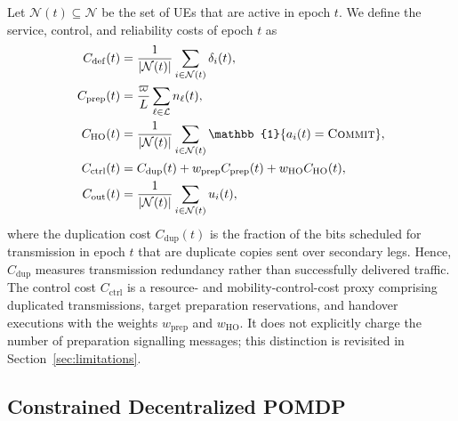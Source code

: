 \documentclass[journal]{IEEEtran}
\newcommand{\Lset}{\mathcal{L}}
\newcommand{\Nset}{\mathcal{N}}
\newcommand{\ind}{\mathbb{1}}
\begin{document}
Let $\Nset(t)\subseteq\Nset$ be the set of UEs that are active in epoch $t$.
We define the service, control, and reliability costs of epoch $t$ as
\begin{align}
C_{\mathrm{def}}(t) &= \frac{1}{|\Nset(t)|}\sum_{i\in\Nset(t)}\delta_i(t),\\
C_{\mathrm{prep}}(t) &= \frac{\varpi}{L}\sum_{\ell\in\Lset}n_\ell(t),\\
C_{\mathrm{HO}}(t) &= \frac{1}{|\Nset(t)|}\sum_{i\in\Nset(t)}\ind\{a_i(t)=\textsc{Commit}\},\\
C_{\mathrm{ctrl}}(t) &= C_{\mathrm{dup}}(t)+w_{\mathrm{prep}}C_{\mathrm{prep}}(t)+w_{\mathrm{HO}}C_{\mathrm{HO}}(t),\\
C_{\mathrm{out}}(t) &= \frac{1}{|\Nset(t)|}\sum_{i\in\Nset(t)}u_i(t),
\end{align}
where the duplication cost $C_{\mathrm{dup}}(t)$ is the fraction of the bits
scheduled for transmission in epoch $t$ that are duplicate copies sent over
secondary legs. Hence, $C_{\mathrm{dup}}$ measures transmission redundancy
rather than successfully delivered traffic. The control cost
$C_{\mathrm{ctrl}}$ is a resource- and mobility-control-cost proxy comprising
duplicated transmissions, target preparation reservations, and handover
executions with the weights $w_{\mathrm{prep}}$ and $w_{\mathrm{HO}}$. It does
not explicitly charge the number of preparation signalling messages; this
distinction is revisited in Section~\ref{sec:limitations}.

\subsection{Constrained Decentralized POMDP}
\end{document}
